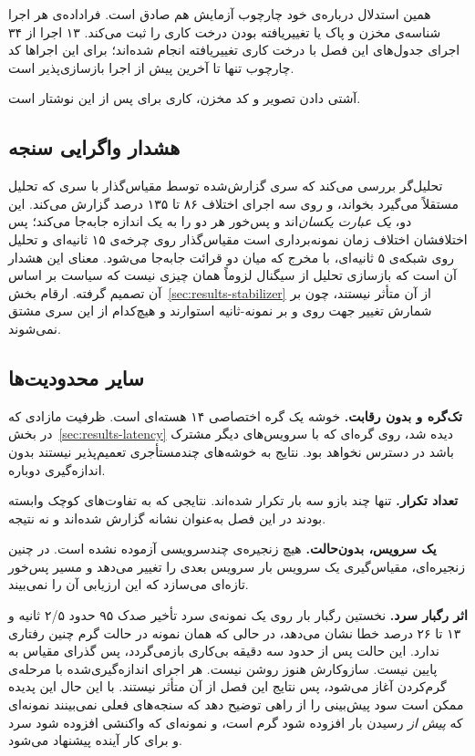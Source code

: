 همین استدلال درباره‌ی خود چارچوب آزمایش هم صادق است. فراداده‌ی هر اجرا شناسه‌ی 
مخزن و پاک یا تغییریافته بودن درخت کاری را ثبت می‌کند. ۱۳ اجرا از ۳۴ اجرای جدول‌های این فصل با
درخت کاری تغییریافته انجام شده‌اند؛ برای این اجراها کد چارچوب تنها تا آخرین  پیش از
اجرا بازسازی‌پذیر است.

آشتی دادن تصویر و کد مخزن، کاری برای پس از این نوشتار است.

\subsection{هشدار واگرایی سنجه}
\label{sec:validity-metricdiff}

تحلیل‌گر بررسی می‌کند که سری  گزارش‌شده توسط مقیاس‌گذار با
سری  که تحلیل مستقلاً می‌گیرد بخواند، و روی سه اجرای
 اختلاف ۸۶ تا ۱۳۵ درصد گزارش می‌کند. این دو، \emph{یک عبارت
 یکسان}‌اند و پس‌خور هر دو را به یک اندازه جابه‌جا می‌کند؛ پس اختلافشان اختلاف
زمان نمونه‌برداری است \mdash{} مقیاس‌گذار روی چرخه‌ی ۱۵ ثانیه‌ای و تحلیل روی شبکه‌ی ۵
ثانیه‌ای، با مخرج  که میان دو قرائت جابه‌جا می‌شود. معنای این هشدار آن است
که بازسازی تحلیل از سیگنال لزوماً همان چیزی نیست که سیاست بر اساس آن تصمیم گرفته. ارقام
بخش~\ref{sec:results-stabilizer} از آن متأثر نیستند، چون بر شمارش تغییر جهت روی
 و بر نمونه-ثانیه استوارند و هیچ‌کدام از این سری مشتق نمی‌شوند.

\subsection{سایر محدودیت‌ها}
\label{sec:results-otherlimits}

\textbf{تک‌گره و بدون رقابت.} خوشه یک گره اختصاصی ۱۴ هسته‌ای است. ظرفیت مازادی که در
بخش~\ref{sec:results-latency} دیده شد، روی گره‌ای که با سرویس‌های دیگر مشترک باشد در دسترس
نخواهد بود. نتایج به خوشه‌های چندمستأجری تعمیم‌پذیر نیستند بدون اندازه‌گیری دوباره.

\textbf{تعداد تکرار.} تنها چند بازو سه بار تکرار شده‌اند. نتایجی که به تفاوت‌های کوچک وابسته
بودند در این فصل به‌عنوان نشانه گزارش شده‌اند و نه نتیجه.

\textbf{یک سرویس، بدون‌حالت.} هیچ زنجیره‌ی چندسرویسی آزموده نشده است. در چنین زنجیره‌ای،
مقیاس‌گیری یک سرویس بار سرویس بعدی را تغییر می‌دهد و مسیر پس‌خور تازه‌ای می‌سازد که این
ارزیابی آن را نمی‌بیند.

\textbf{اثر رگبار سرد.} نخستین رگبار بار روی یک نمونه‌ی سرد تأخیر صدک ۹۵ حدود ۲/۵ ثانیه و ۱۳
تا ۲۶ درصد خطا نشان می‌دهد، در حالی که همان نمونه در حالت گرم چنین رفتاری ندارد. این حالت پس
از حدود سه دقیقه بی‌کاری بازمی‌گردد، پس گذرای مقیاس به پایین نیست. سازوکارش هنوز روشن نیست.
هر اجرای اندازه‌گیری‌شده با مرحله‌ی گرم‌کردن آغاز می‌شود، پس نتایج این فصل از آن متأثر
نیستند. با این حال این پدیده ممکن است سود پیش‌بینی را از راهی توضیح دهد که سنجه‌های فعلی
نمی‌بینند \mdash{} نمونه‌ای که \emph{پیش از} رسیدن بار افزوده شود گرم است، و نمونه‌ای که واکنشی
افزوده شود سرد \mdash{} و برای کار آینده پیشنهاد می‌شود.

